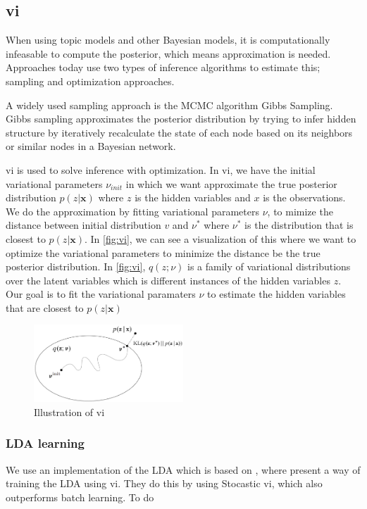 \subsection{\gls{vi}}
When using topic models and other Bayesian models, it is computationally infeasable to compute the posterior, which means approximation is needed. 
Approaches today use two types of inference algorithms to estimate this; sampling and optimization approaches.

A widely used sampling approach is the MCMC algorithm Gibbs Sampling.
Gibbs sampling approximates the posterior distribution by trying to infer hidden structure by iteratively recalculate the state of each node based on its neighbors or similar nodes in a Bayesian network.

\gls{vi} is used to solve inference with optimization.
In \gls{vi}, we have the initial variational parameters $\nu_{init}$ in which we want approximate the true posterior distribution $p(z|\textbf{x})$ where $z$ is the hidden variables and $x$ is the observations.
We do the approximation by fitting variational parameters $\nu$, to mimize the distance between initial distribution $v$ and $\nu^*$ where $\nu^*$ is the distribution that is closest to $p(z|\textbf{x})$.
In \autoref{fig:vi}, we can see a visualization of this where we want to optimize the variational parameters to minimize the distance be the true posterior distribution.
In \autoref{fig:vi}, $q(z; \nu)$ is a family of variational distributions over the latent variables which is different instances of the hidden variables $z$.
Our goal is to fit the variational paramaters $\nu$ to estimate the hidden variables that are closest to $p(z|\textbf{x})$

\begin{figure}
	\centering
	\includegraphics[width=0.5\textwidth]{figures/vi_illustration.png}
	\caption[Caption for LOF]{Illustration of \acrlong{vi}\footnotemark}
	\label{fig:vi}
\end{figure}

\subsubsection{LDA learning}
We use an implementation of the LDA which is based on \cite{blei2010online}, where \citeauthor{blei2010online} present a way of training the LDA using \gls{vi}.
They do this by using Stocastic \gls{vi}, which also outperforms batch learning.
To do  
